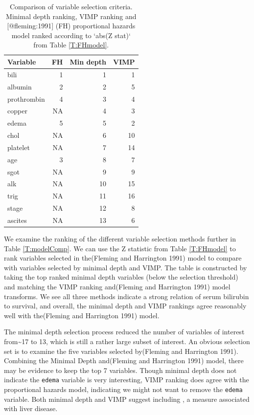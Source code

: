 \documentclass[article]{jss}
\begin{document}
\begin{Schunk}
\begin{table}

\caption{Comparison of variable selection criteria. Minimal depth ranking, VIMP ranking and [@fleming:1991] (FH) proportional hazards model ranked according to `abs(Z stat)` from Table \ref{T:FHmodel}.}
\centering
\begin{tabular}[t]{l|r|r|r}
\hline
Variable & FH & Min depth & VIMP\\
\hline
bili & 1 & 1 & 1\\
\hline
albumin & 2 & 2 & 5\\
\hline
prothrombin & 4 & 3 & 4\\
\hline
copper & NA & 4 & 3\\
\hline
edema & 5 & 5 & 2\\
\hline
chol & NA & 6 & 10\\
\hline
platelet & NA & 7 & 14\\
\hline
age & 3 & 8 & 7\\
\hline
sgot & NA & 9 & 9\\
\hline
alk & NA & 10 & 15\\
\hline
trig & NA & 11 & 16\\
\hline
stage & NA & 12 & 8\\
\hline
ascites & NA & 13 & 6\\
\hline
\end{tabular}
\end{table}

\end{Schunk}

We examine the ranking of the different variable selection methods
further in Table \ref{T:modelComp}. We can use the Z statistic from
Table \ref{T:FHmodel} to rank variables selected in the(Fleming and
Harrington 1991) model to compare with variables selected by minimal
depth and VIMP. The table is constructed by taking the top ranked
minimal depth variables (below the selection threshold) and matching the
VIMP ranking and(Fleming and Harrington 1991) model transforms. We see
all three methods indicate a strong relation of serum bilirubin to
survival, and overall, the minimal depth and VIMP rankings agree
reasonably well with the(Fleming and Harrington 1991) model.

The minimal depth selection process reduced the number of variables of
interest from\textasciitilde{}17 to 13, which is still a rather large
subset of interest. An obvious selection set is to examine the five
variables selected by(Fleming and Harrington 1991). Combining the
Minimal Depth and(Fleming and Harrington 1991) model, there may be
evidence to keep the top 7 variables. Though minimal depth does not
indicate the \texttt{edema} variable is very interesting, VIMP ranking
does agree with the proportional hazards model, indicating we might not
want to remove the \texttt{edema} variable. Both minimal depth and VIMP
suggest including , a measure associated with liver
disease.
\end{document}

